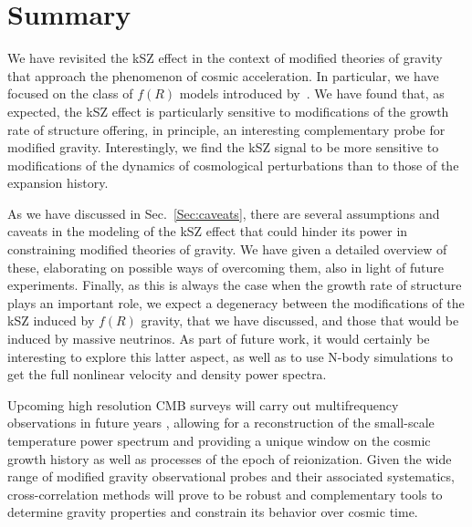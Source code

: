 \section{Summary}\label{Sec:concl}
We have revisited the kSZ effect in the context of modified theories of gravity that approach the phenomenon of cosmic acceleration. In particular, we have focused on the class of $f(R)$ models introduced by~\cite{Hu2007}. We have found that, as expected, the kSZ effect is particularly sensitive to modifications of the growth rate of structure offering,  in principle, an interesting complementary probe  for modified gravity. Interestingly, we find the kSZ signal to be more sensitive to modifications of the dynamics of cosmological perturbations than to those of the expansion history. 

As we have discussed in Sec.~\eqref{Sec:caveats}, there are several assumptions and caveats in the modeling of the kSZ effect that could hinder its power in constraining modified theories of gravity. We have given a detailed overview of these, elaborating on possible ways of overcoming them, also in light of future experiments. Finally, as this is always the case when the growth rate of structure plays an important role, we expect a degeneracy between the modifications of the kSZ induced by $f(R)$ gravity, that we have discussed, and those that would be induced by massive neutrinos. As part of future work, it would certainly be interesting to explore this latter aspect, as well as to use N-body simulations to get  the full nonlinear velocity and density power spectra.  

Upcoming high resolution CMB surveys will carry out multifrequency observations in future years \citep{Calabrese2014}, allowing for a reconstruction of the small-scale temperature power spectrum and providing a unique window on the cosmic growth history as well as  processes of the epoch of reionization. Given the wide range of modified gravity observational probes and their associated systematics, cross-correlation methods will prove to be robust and complementary tools to determine gravity properties and constrain its behavior over cosmic time. 
